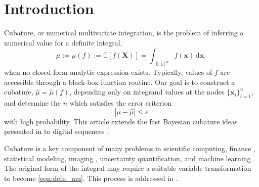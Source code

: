 \documentclass[graybox,footinfo]{svmult}
\newcommand{\bm}[1]{\boldsymbol{#1}}
\newcommand{\dif}[1]{\text{d}{#1}}
\newcommand{\Ex}{\mathbb{E}}
\newcommand{\vx}{\bm{x}}
\newcommand{\dvx}{\dif{\bm{x}}}
\newcommand{\hmu}{\widehat{\mu}}
\newcommand{\errtol}{\varepsilon}
\def\abs#1{\ensuremath{\left \lvert #1 \right \rvert}}
\newcommand{\JRNote}[1]{{\textcolor{green}{JR: #1}}}
\begin{document}





\section{Introduction}
\label{intro}

Cubature, or numerical multivariate integration, is the problem of inferring a numerical value for a definite integral, 
\begin{equation}
\label{eqn:defn_mu}
\mu:= \mu(f) := \Ex[f(\boldsymbol{X})] = \int_{[0,1]^d} f(\vx)\, \dvx, 
\end{equation}
when no closed-form analytic expression exists. Typically, values of $f$ are accessible through a black-box function routine. Our goal is to construct a cubature, $\hmu = \hmu(f)$, depending only on integrand values at the nodes $\{\vx_i\}_{i=1}^n$, and determine the $n$ which satisfies the error criterion
\begin{equation}
\label{eqn:err_crit} 
\abs{\mu - \hmu} \leq \errtol
\end{equation}
with high probability. This article extends the fast Bayesian cubature ideas presented in \cite{RatHic19a} to digital sequences \cite{DicPil10a}.


Cubature is a key component of many problems in scientific computing, finance \cite{Gla03}, statistical modeling, imaging \cite{Keller2013}, uncertainty quantification, and machine learning \cite{Goodfellow-et-al-2016}. 
The original form of the integral may require a suitable variable transformation to become \eqref{eqn:defn_mu}. This process is addressed in \cite{BecHae92b, Sid08a, Sid93, Lau96a, CriEtal07}. 
\end{document}
